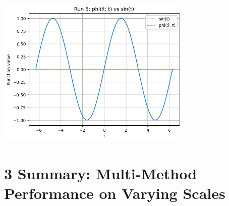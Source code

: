 \documentclass[12pt]{article}
\begin{document}
\includegraphics[width=0.7\textwidth]{figures/plot_10.png}

\section*{3 Summary: Multi-Method Performance on Varying Scales}
\end{document}
